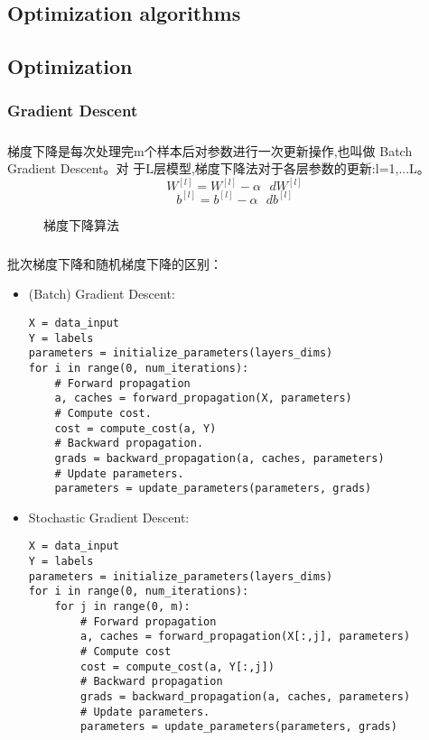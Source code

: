 \documentclass{article}
\begin{document}
\begin{CJK}{UTF8}{gbsn}
\section{Optimization algorithms}
\subsection{Optimization}
\subsubsection{Gradient Descent}
\subparagraph{}
梯度下降是每次处理完m个样本后对参数进行一次更新操作,也叫做 Batch Gradient Descent。对
于L层模型,梯度下降法对于各层参数的更新:l=1,...L。
\begin{equation}
W^{[l]} = W^{[l]} - \alpha \text{ } dW^{[l]} \tag{1}
\end{equation}
\begin{equation}
b^{[l]} = b^{[l]} - \alpha \text{ } db^{[l]} \tag{2}
\end{equation}
\begin{figure}[H]
\label{fig:37}
\caption{梯度下降算法}
\end{figure}
\subparagraph{}
批次梯度下降和随机梯度下降的区别：
\begin{itemize}
\item (Batch) Gradient Descent:
\begin{verbatim}
X = data_input
Y = labels
parameters = initialize_parameters(layers_dims)
for i in range(0, num_iterations):
    # Forward propagation
    a, caches = forward_propagation(X, parameters)
    # Compute cost.
    cost = compute_cost(a, Y)
    # Backward propagation.
    grads = backward_propagation(a, caches, parameters)
    # Update parameters.
    parameters = update_parameters(parameters, grads)
\end{verbatim}
\item Stochastic Gradient Descent:
\begin{verbatim}
X = data_input
Y = labels
parameters = initialize_parameters(layers_dims)
for i in range(0, num_iterations):
    for j in range(0, m):
        # Forward propagation
        a, caches = forward_propagation(X[:,j], parameters)
        # Compute cost
        cost = compute_cost(a, Y[:,j])
        # Backward propagation
        grads = backward_propagation(a, caches, parameters)
        # Update parameters.
        parameters = update_parameters(parameters, grads)
\end{verbatim}

\end{itemize}
\end{CJK}
\end{document}

